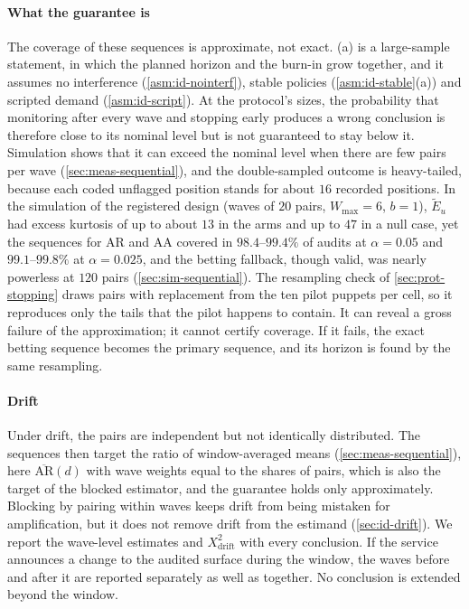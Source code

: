 \paragraph{What the guarantee is}
The coverage of these sequences is approximate, not exact. (a) is a large-sample statement, in which the planned horizon and the burn-in grow together, and it assumes no interference (\cref{asm:id-nointerf}), stable policies (\cref{asm:id-stable}(a)) and scripted demand (\cref{asm:id-script}). At the protocol's sizes, the probability that monitoring after every wave and stopping early produces a wrong conclusion is therefore close to its nominal level but is not guaranteed to stay below it. Simulation shows that it can exceed the nominal level when there are few pairs per wave (\cref{sec:meas-sequential}), and the double-sampled outcome is heavy-tailed, because each coded unflagged position stands for about $16$ recorded positions.
In the simulation of the registered design (waves of $20$ pairs, $W_{\max}=6$, $b=1$), $\widetilde E_u$ had excess kurtosis of up to about $13$ in the arms and up to $47$ in a null case, yet the sequences for $\mathrm{AR}$ and $\mathrm{AA}$ covered in $98.4$--$99.4\%$ of audits at $\alpha=0.05$ and $99.1$--$99.8\%$ at $\alpha=0.025$, and the betting fallback, though valid, was nearly powerless at $120$ pairs (\cref{sec:sim-sequential}).
The resampling check of \cref{sec:prot-stopping} draws pairs with replacement from the ten pilot puppets per cell, so it reproduces only the tails that the pilot happens to contain. It can reveal a gross failure of the approximation; it cannot certify coverage. If it fails, the exact betting sequence becomes the primary sequence, and its horizon is found by the same resampling.

\paragraph{Drift}
Under drift, the pairs are independent but not identically distributed. The sequences then target the ratio of window-averaged means (\cref{sec:meas-sequential}), here $\overline{\mathrm{AR}}(d)$ with wave weights equal to the shares of pairs, which is also the target of the blocked estimator, and the guarantee holds only approximately. Blocking by pairing within waves keeps drift from being mistaken for amplification, but it does not remove drift from the estimand (\cref{sec:id-drift}). We report the wave-level estimates and $X^2_{\mathrm{drift}}$ with every conclusion. If the service announces a change to the audited surface during the window, the waves before and after it are reported separately as well as together. No conclusion is extended beyond the window.

